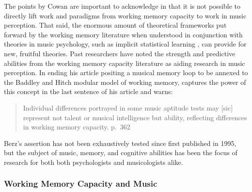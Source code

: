 \documentclass[12pt,]{book}
\begin{document}
The points by Cowan are important to acknowledge in that it is not possible to directly lift work and paradigms from working memory capacity to work in music perception.
That said, the enormous amount of theoretical frameworks put forward by the working memory literature when understood in conjunction with theories in music psychology, such as implicit statistical learning \citep{saffranStatisticalLearningTone1999}, can provide for new, fruitful theories.
Past researchers have noted the strength and predictive abilities from the working memory capacity literature as aiding research in music perception.
In ending his article positing a musical memory loop to be annexed to the Baddley and Hitch modular model of working memory, \citet{berzWorkingMemoryMusic1995} captures the power of this concept in the last sentence of his article and warns:

\begin{quote}
Individual differences portrayed in some music aptitude tests may {[}sic{]} represent not talent or musical intelligence but ability, reflecting differences in working memory capacity. p.~362
\end{quote}

Berz's assertion has not been exhaustively tested since first published in 1995, but the subject of music, memory, and cognitive abilities has been the focus of research for both both psychologists and musicologists alike.

\hypertarget{working-memory-capacity-and-music}{%
\subsubsection{Working Memory Capacity and Music}\label{working-memory-capacity-and-music}}
\end{document}
